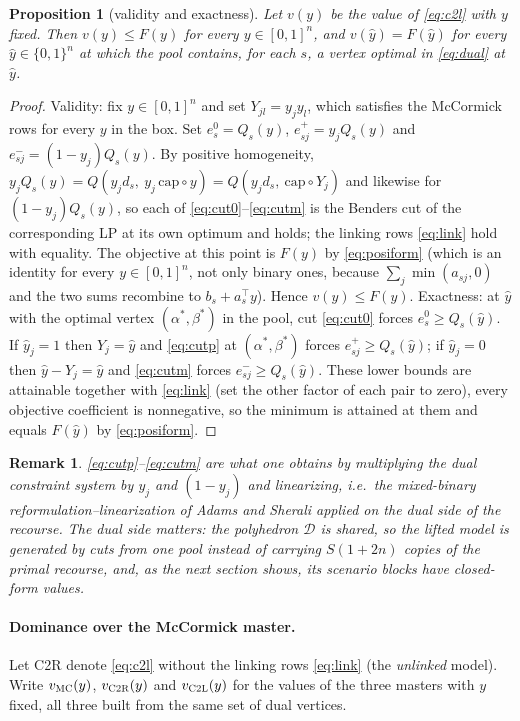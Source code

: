 \documentclass[11pt]{article}
\newtheorem{proposition}{Proposition}
\newtheorem{remark}{Remark}
\newcommand{\capa}{\mathrm{cap}}
\newcommand{\D}{\mathcal{D}}
\newcommand{\T}{^{\top}}
\begin{document}
\begin{proposition}[validity and exactness]\label{prop:exact}
Let $v(y)$ be the value of \eqref{eq:c2l} with $y$ fixed. Then $v(y)\le F(y)$ for every $y\in[0,1]^n$, and $v(\hat y) = F(\hat y)$ for every $\hat y\in\{0,1\}^n$ at which the pool contains, for each
$s$, a vertex optimal in \eqref{eq:dual} at $\hat y$.
\end{proposition}
\begin{proof}
Validity: fix $y\in[0,1]^n$ and set $Y_{jl} = y_jy_l$, which satisfies the McCormick rows for every $y$ in the
box. Set $e^0_s = Q_s(y)$, $e^+_{sj} = y_jQ_s(y)$ and $e^-_{sj} = (1-y_j)Q_s(y)$. By positive homogeneity,
$y_jQ_s(y) = Q(y_jd_s,\ y_j\,\capa\circ y) = Q(y_jd_s,\ \capa\circ Y_j)$ and likewise for $(1-y_j)Q_s(y)$, so each of
\eqref{eq:cut0}--\eqref{eq:cutm} is the Benders cut of the corresponding LP at its own optimum and holds; the
linking rows \eqref{eq:link} hold with equality. The objective at this point is $F(y)$ by \eqref{eq:posiform} (which
is an identity for every $y\in[0,1]^n$, not only binary ones, because $\sum_j\min(a_{sj},0)$ and the two sums
recombine to $b_s + a_s\T y$). Hence $v(y)\le F(y)$. Exactness: at $\hat y$ with the optimal vertex $(\alpha^*,\beta^*)$ in the pool,
cut \eqref{eq:cut0} forces $e^0_s\ge Q_s(\hat y)$. If $\hat y_j = 1$ then $Y_j = \hat y$ and \eqref{eq:cutp} at
$(\alpha^*,\beta^*)$ forces $e^+_{sj}\ge Q_s(\hat y)$; if $\hat y_j = 0$ then $\hat y - Y_j = \hat y$ and
\eqref{eq:cutm} forces $e^-_{sj}\ge Q_s(\hat y)$. These lower bounds are attainable together with
\eqref{eq:link} (set the other factor of each pair to zero), every objective coefficient is nonnegative, so the
minimum is attained at them and equals $F(\hat y)$ by \eqref{eq:posiform}.
\end{proof}

\begin{remark}
\eqref{eq:cutp}--\eqref{eq:cutm} are what one obtains by multiplying the dual constraint system by $y_j$ and
$(1-y_j)$ and linearizing, i.e.\ the mixed-binary reformulation--linearization of Adams and Sherali
\cite{adams-sherali} applied on the \emph{dual} side of the recourse. The dual side matters: the polyhedron $\D$ is
shared, so the lifted model is generated by cuts from one pool instead of carrying $S(1+2n)$ copies of the primal
recourse, and, as the next section shows, its scenario blocks have closed-form values.
\end{remark}

\paragraph{Dominance over the McCormick master.} Let \textsc{C2R} denote \eqref{eq:c2l} without the linking rows
\eqref{eq:link} (the \emph{unlinked} model). Write $v_{\textsc{MC}}(y)$, $v_{\textsc{C2R}}(y)$ and $v_{\textsc{C2L}}(y)$ for the
values of the three masters with $y$ fixed, all three built from the same set of dual vertices.
\end{document}
